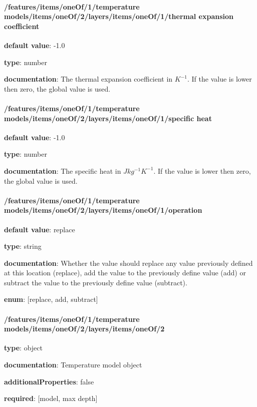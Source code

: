 \begin{itemized}
\end{itemized}\paragraph{/features/items/oneOf/1/temperature models/items/oneOf/2/layers/items/oneOf/1/thermal expansion coefficient} \begin{itemized}
\item {\bf default value}: -1.0
\item {\bf type}: number
\item {\bf documentation}: The thermal expansion coefficient in $K^{-1}$. If the value is lower then zero, the global value is used.
\end{itemized}\paragraph{/features/items/oneOf/1/temperature models/items/oneOf/2/layers/items/oneOf/1/specific heat} \begin{itemized}
\item {\bf default value}: -1.0
\item {\bf type}: number
\item {\bf documentation}: The specific heat in $J kg^{-1} K^{-1}$. If the value is lower then zero, the global value is used.
\end{itemized}\paragraph{/features/items/oneOf/1/temperature models/items/oneOf/2/layers/items/oneOf/1/operation} \begin{itemized}
\item {\bf default value}: replace
\item {\bf type}: string
\item {\bf documentation}: Whether the value should replace any value previously defined at this location (replace), add the value to the previously define value (add) or subtract the value to the previously define value (subtract).
\item {\bf enum}: [replace, add, subtract]\end{itemized}\paragraph{/features/items/oneOf/1/temperature models/items/oneOf/2/layers/items/oneOf/2} \begin{itemized}
\item {\bf type}: object
\item {\bf documentation}: Temperature model object
\item {\bf additionalProperties}: false
\item {\bf required}: [model, max depth]\end{itemized}
